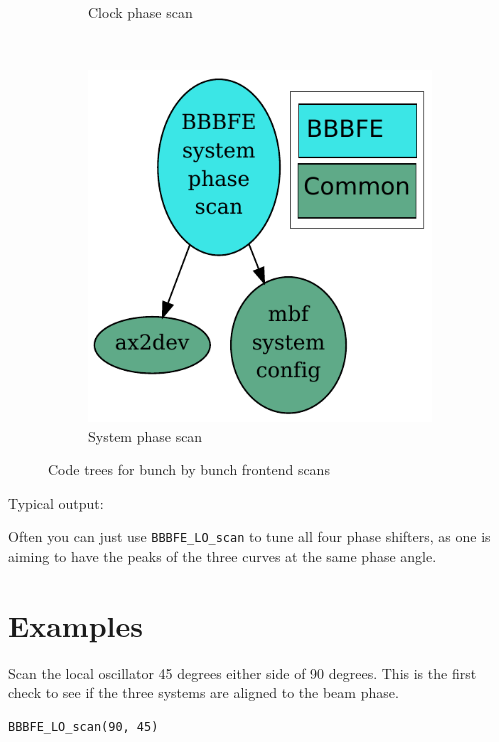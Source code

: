\documentclass{report}
\begin{document}
\begin{figure}[hbt]
\begin{subfigure}[b]{0.3\textwidth}
        \caption{Clock phase scan}
        \label{fig:clock_phase_scan}
    \end{subfigure}
    ~ %
    \begin{subfigure}[b]{0.3\textwidth}
        \includegraphics[width=\textwidth]{BBBFE_system_phase_scan.pdf}
        \caption{System phase scan}
        \label{fig:system_phase_scan}
    \end{subfigure}
    \caption{Code trees for bunch by bunch frontend scans}\label{fig:BBBFE_code_trees}
\end{figure}

Typical output:

Often you can just use \verb|BBBFE_LO_scan| to tune all four phase shifters, as one is aiming to have the peaks of the three curves at the same phase angle.

\section{Examples}

Scan the local oscillator 45 degrees either side of 90 degrees. This is the first check to see if the three systems are aligned to the beam phase.
\begin{verbatim}
BBBFE_LO_scan(90, 45)
\end{verbatim}
\end{document}
